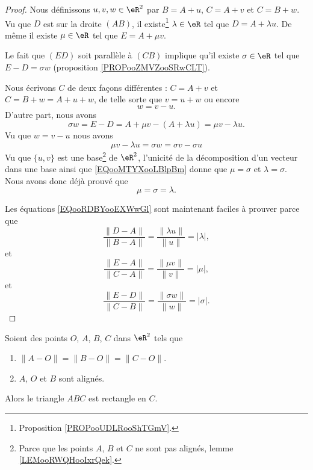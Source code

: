 \begin{proof}
	Nous définissons \( u,v,w\in \eR^2\) par \( B=A+u\), \( C=A+v\) et \( C=B+w\). Vu que \( D\) est sur la droite \( (AB)\), il existe\footnote{Proposition \ref{PROPooUDLRooShTGmV}.} \( \lambda\in \eR\) tel que \( D=A+\lambda u\). De même il existe \( \mu\in \eR\) tel que \( E=A+\mu v\).

	Le fait que \( (ED)\) soit parallèle à \( (CB)\) implique qu'il existe \( \sigma\in \eR\) tel que \( E-D=\sigma w\) (proposition \ref{PROPooZMVZooSRwCLT}).

	Nous écrivons \( C\) de deux façons différentes : \( C=A+v\) et \( C=B+w=A+u+w\), de telle sorte que \( v=u+w\) ou encore
	\begin{equation}
		w=v-u.
	\end{equation}
	D'autre part, nous avons
	\begin{equation}
		\sigma w=E-D=A+\mu v-(A+\lambda u)=\mu v-\lambda u.
	\end{equation}
	Vu que \( w=v-u\) nous avons
	\begin{equation}		\label{EQooMTYXooLBlpBm}
		\mu v-\lambda u=\sigma w=\sigma v-\sigma u
	\end{equation}
	Vu que \( \{ u,v \}\) est une base\footnote{Parce que les points \( A\), \( B\) et \( C\) ne sont pas alignés, lemme \ref{LEMooRWQHooIxrQek}.} de \( \eR^2\), l'unicité de la décomposition d'un vecteur dans une base ainsi que \ref{EQooMTYXooLBlpBm} donne que \( \mu=\sigma\) et \( \lambda=\sigma\). Nous avons donc déjà prouvé que
	\begin{equation}
		\mu=\sigma=\lambda.
	\end{equation}

	Les équations \eqref{EQooRDBYooEXWwGl} sont maintenant faciles à prouver parce que
	\begin{equation}
		\frac{ \| D-A \| }{ \| B-A \| }=\frac{ \| \lambda u \| }{ \| u \| }=| \lambda |,
	\end{equation}
	et
	\begin{equation}
		\frac{ \| E-A \| }{ \| C-A \| }=\frac{ \| \mu v \| }{ \| v \| }=| \mu |,
	\end{equation}
	et
	\begin{equation}
		\frac{ \| E-D \| }{ \| C-B \| }=\frac{ \| \sigma w \| }{ \| w \| }=| \sigma |.
	\end{equation}
\end{proof}

\begin{theorem}      \label{THOooGFTWooACQLFJ}
	Soient des points \( O\), \( A\), \( B\), \( C\) dans \( \eR^2\) tels que
	\begin{enumerate}
		\item
		      \( \| A-O \|=\| B-O \|=\| C-O \|\).
		\item
		      \( A\), \( O\) et \( B\) sont alignés.
	\end{enumerate}
	Alors le triangle \( ABC\) est rectangle en \( C\).
\end{theorem}


